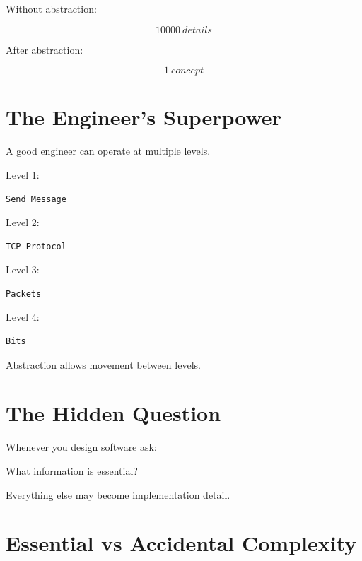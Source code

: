 \documentclass[11pt,a4paper]{book}
\begin{document}
Without abstraction:

\[
10000\ details
\]

After abstraction:

\[
1\ concept
\]


\section{The Engineer's Superpower}

A good engineer can operate at multiple levels.


Level 1:

\begin{verbatim}
Send Message
\end{verbatim}

Level 2:

\begin{verbatim}
TCP Protocol
\end{verbatim}

Level 3:

\begin{verbatim}
Packets
\end{verbatim}

Level 4:

\begin{verbatim}
Bits
\end{verbatim}


Abstraction allows movement between levels.


\section{The Hidden Question}

Whenever you design software ask:

\begin{center}
What information is essential?
\end{center}

Everything else may become implementation detail.


\section{Essential vs Accidental Complexity}
\end{document}
